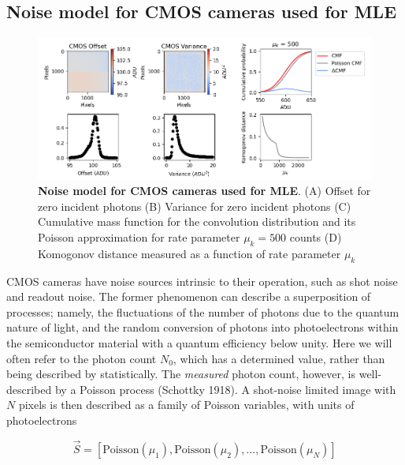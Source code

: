 \documentclass{ucetd}
\begin{document}
\subsection{Noise model for CMOS cameras used for MLE}

\begin{figure}
\begin{center}
\includegraphics[width=16cm]{Noise.png}
\end{center}
\caption{\textbf{Noise model for CMOS cameras used for MLE}. (A) Offset for zero incident photons (B) Variance for zero incident photons (C) Cumulative mass function for the convolution distribution and its Poisson approximation for rate parameter $\mu_{k} = 500$ counts (D) Komogonov distance measured as a function of rate parameter $\mu_{k}$}
\end{figure}

CMOS cameras have noise sources intrinsic to their operation, such as shot noise and readout noise. The former phenomenon can describe a superposition of processes; namely, the fluctuations of the number of photons due to the quantum nature of light, and the random conversion of photons into photoelectrons within the semiconductor material with a quantum efficiency below unity. Here we will often refer to the photon count $N_{0}$, which has a determined value, rather than being described by statistically. The \emph{measured} photon count, however, is well-described by a Poisson process (Schottky 1918). A shot-noise limited image with $N$ pixels is then described as a family of Poisson variables, with units of photoelectrons


\begin{equation}
\vec{S} = \left[\mathrm{Poisson}(\mu_{1}), \mathrm{Poisson}(\mu_{2}), ..., \mathrm{Poisson}(\mu_{N})\right]
\end{equation}
\end{document}
